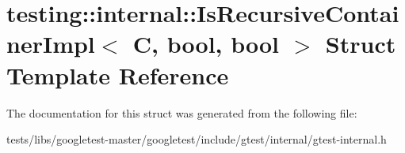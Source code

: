 \hypertarget{structtesting_1_1internal_1_1IsRecursiveContainerImpl}{}\section{testing\+:\+:internal\+:\+:Is\+Recursive\+Container\+Impl$<$ C, bool, bool $>$ Struct Template Reference}
\label{structtesting_1_1internal_1_1IsRecursiveContainerImpl}


The documentation for this struct was generated from the following file\+:\begin{DoxyCompactItemize}
\item 
tests/libs/googletest-\/master/googletest/include/gtest/internal/gtest-\/internal.\+h\end{DoxyCompactItemize}
